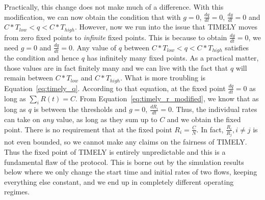 Practically, this change does not make much of a difference. With this
modification, we can now obtain the condition that with $g =0$, $\tfrac{dq}{dt}
= 0$, $\tfrac{dg}{dt} = 0$ and $C*T_{low} < q < C*T_{high}$. However, now we run
into the issue that TIMELY moves from zero fixed points to \emph{infinite} fixed
points. This is because to obtain $\tfrac{dg}{dt} =0$, we need $g = 0$ and
$\tfrac{dq}{dt} = 0$. Any value of $q$ between $C*T_{low} < q < C*T_{high}$
satisfies the condition and hence $q$ has infinitely many fixed points. As a
practical matter, those values are in fact finitely many and we can live with
the fact that $q$ will remain between $C*T_{low}$ and $C*T_{high}$. What is more
troubling is Equation~\ref{eq:timely_q}. According to that equation, at the
fixed point $\tfrac{dq}{dt} = 0$ as long as $\sum_{i} R(t) =  C$. From
Equation~\ref{eq:timely_r_modified}, we know that as long as $q$ is between the
thresholds and $g=0$, $\tfrac{dR_i}{dt} = 0$. Thus, the individual rates can
take on \emph{any} value, as long as they sum up to $C$ and we obtain the fixed
point. There is no requirement that at the fixed point $R_i = \tfrac{C}{N}$. In
fact, $\tfrac{R_{i}}{R_{j}}, i \ne j$ is not even bounded, so we cannot make any
claims on the fairness of TIMELY. Thus the fixed point of TIMELY is entirely
unpredictable and this is a fundamental flaw of the protocol. This is borne out
by the simulation results below where we only change the start time and initial
rates of two flows, keeping everything else constant, and we end up in
completely different operating regimes.


